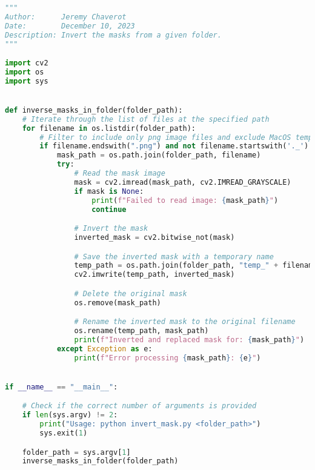\begin{lstlisting}[language=Python, label=lst:4, caption=Python script \texttt{invert\_mask.py} to invert the masks from a specified folder. We aim to have a black object set against a white background.]
"""
Author:      Jeremy Chaverot
Date:        December 10, 2023
Description: Invert the masks from a given folder.
"""

import cv2
import os
import sys


def inverse_masks_in_folder(folder_path):
	# Iterate through the list of files at the specified path
    for filename in os.listdir(folder_path):
    	# Filter to include only png image files and exclude MacOS temporary files
        if filename.endswith(".png") and not filename.startswith('._'):
            mask_path = os.path.join(folder_path, filename)
            try:
                # Read the mask image
                mask = cv2.imread(mask_path, cv2.IMREAD_GRAYSCALE)
                if mask is None:
                    print(f"Failed to read image: {mask_path}")
                    continue

                # Invert the mask
                inverted_mask = cv2.bitwise_not(mask)

                # Save the inverted mask with a temporary name
                temp_path = os.path.join(folder_path, "temp_" + filename)
                cv2.imwrite(temp_path, inverted_mask)

                # Delete the original mask
                os.remove(mask_path)

                # Rename the inverted mask to the original filename
                os.rename(temp_path, mask_path)
                print(f"Inverted and replaced mask for: {mask_path}")
            except Exception as e:
                print(f"Error processing {mask_path}: {e}")


if __name__ == "__main__":

	# Check if the correct number of arguments is provided
    if len(sys.argv) != 2:
        print("Usage: python invert_mask.py <folder_path>")
        sys.exit(1)

    folder_path = sys.argv[1]
    inverse_masks_in_folder(folder_path)
\end{lstlisting}

\bigskip

